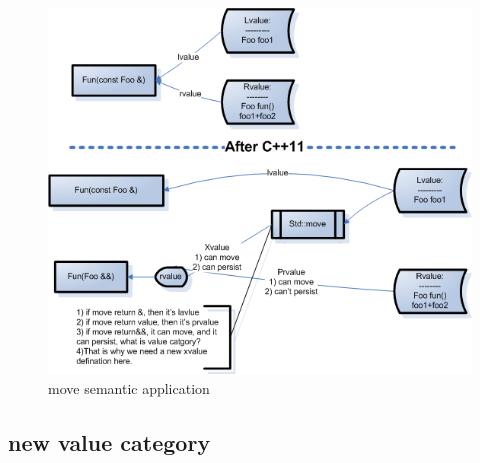 \documentclass[a4paper,11pt,twoside]{book}
\begin{document}
\begin{itemize}
	
	\begin{figure}[h]
		\centering
		\includegraphics[width=0.7\linewidth]{pics/xvalue.png}
		\caption{move semantic application}
		\label{fig:xvalue}
	\end{figure}	
\end{itemize}


\subsection{new value category}
\end{document}
